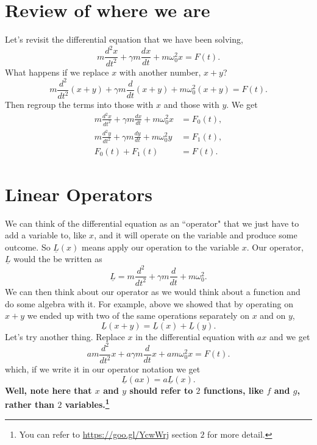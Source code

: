 \documentclass[]{revtex4}
\newcommand{\sm}[1]{{\[#1\]}}
\newcommand{\st}[1]{{\color{red}\bfseries #1}}
\begin{document}
\section*{Review of where we are}

Let's revisit the differential equation that we have been solving,
\[m\frac{d^2x}{dt^2}+\gamma m \frac{dx}{dt} + m\omega_0^2 x = F(t).\label{diff}\]
What happens if we replace $x$ with another number, $x+y$?
\st{
  \begin{equation}
    m \frac{ d^2 }{ dt^2 }(x + y) + \gamma m \frac{ d }{ dt } (x + y) + m \omega_0^2 (x + y) = F(t).
  \end{equation}
}
Then regroup the terms into those with $x$ and those with $y$.  We get
\st{
  \begin{equation}
    \begin{split}
      m\frac{d^2x}{dt^2}+\gamma m \frac{dx}{dt} + m\omega_0^2 x &= F_0(t), \\
      m\frac{d^2 y}{dt^2}+\gamma m \frac{d y}{dt} + m\omega_0^2 y &= F_1(t), \\
      F_0(t) + F_1 (t) &= F(t).
    \end{split}
  \end{equation}
}

\section*{Linear Operators}

We can think of the differential equation as an ``operator" that we just have to
add a variable to, like $x$, and it will operate on the variable and produce some
outcome.  So $\underline{L}(x)$ means apply our operation to the variable $x$.  Our
operator, $\underline{L}$ would the be written as
\st{
  \begin{equation}
    \underline{L} = m\frac{ d^2 }{ dt^2 } + \gamma m \frac{ d }{ dt } + m \omega_0^2.
  \end{equation}
}
We can then think about our operator as we would think about a function and do some
algebra with it. For example, above we showed that by operating on $x+y$ we ended
up with two of the same operations separately on $x$ and on $y$,
\sm{\underline{L}(x+y) = \underline{L}(x)+\underline{L}(y).\label{Lx+y}}
Let's try another thing.  Replace $x$ in the differential equation with $ax$ and we get
\st{
  \begin{equation}
    a m \frac{ d^2 }{ dt^2 } x + a \gamma m \frac{ d }{ dt } x + a m \omega_0^2 x = F(t).
  \end{equation}
}
which, if we write it in our operator notation we get
\sm{\underline{L}(ax)=a\underline{L}(x).\label{Lax}}
\st{
  Well, note here that $x$ and $y$ should refer to $2$ functions, like $f$ and $g$,
  rather than $2$ variables.\footnote{You can refer to \url{https://goo.gl/YcwWrj} section $2$
    for more detail.}
}
\end{document}
